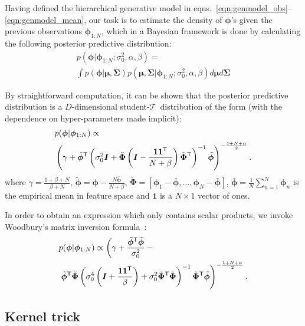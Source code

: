 \documentclass[twoside]{article}
\newcommand{\studentt}{student-$\mathcal{T}$\ }
\newcommand{\transpose}[1]{#1^{\mbox{\sf \scriptsize T}}}
\newcommand{\quadform}[2]{\transpose{#1}#2#1}
\newcommand{\varconc}{\alpha}
\newcommand{\meanconc}{\beta}
\begin{document}
Having defined the hierarchical generative model in eqns.\ \eqref{eqn:genmodel_obs}--\eqref{eqn:genmodel_mean}, our task is to estimate the density of $\bm{\phi}$'s given the previous observations $\bm{\phi}_{1:N}$, which in a Bayesian framework is done by calculating the following posterior predictive distribution:
\begin{multline*}
 p(\bm{\phi}\vert\bm{\phi}_{1:N};\sigma_0^{2},\varconc,\meanconc) = \\
 \int p(\bm{\phi}\vert \bm{\mu},\bm{\Sigma})p(\bm{\mu},\bm{\Sigma}\vert\bm{\phi}_{1:N};\sigma_0^{2},\varconc,\meanconc) d\bm{\mu}d\bm{\Sigma}
\end{multline*}

By straightforward computation, it can be shown that the posterior predictive distribution is a $D$-dimensional \studentt distribution of the form (with the dependence on hyper-parameters made implicit):
\begin{align}
  &p(\bm{\phi}\vert\bm{\phi}_{1:N}) \propto \label{eqn:postpredictive} \\
  &\left( \gamma + \quadform{\tilde{\bm{\phi}}}{\left(\sigma_0^{2}\bm{I} + \tilde{\bm{\Phi}}\left(\bm{I} - \frac{\bm{1}\transpose{\bm{1}}}{N+\meanconc}\right)\transpose{\tilde{\bm{\Phi}}}\right)^{-1}}\right)^{-\frac{1 + N + \varconc}{2}} . \notag
\end{align}
where $\gamma = \frac{1+\meanconc+N}{\meanconc+N}$,  $\tilde{\bm{\phi}} = \bm{\phi} - \frac{N\bar{\bm{\phi}}}{N+\meanconc}$, $\tilde{\bm{\Phi}} = \left[\bm{\phi}_1 - \bar{\bm{\phi}},\ldots,\bm{\phi}_N - \bar{\bm{\phi}}\right]$, $\bar{\bm{\phi}} = \frac{1}{N}\sum_{n=1}^{N}\bm{\phi}_n$ is the empirical mean in feature space and $\bm{1}$ is a $N\times1$ vector of ones.

In order to obtain an expression which only contains scalar products, we invoke Woodbury's matrix inversion formula~\cite{Hager1989}:
\begin{align}
  &p(\bm{\phi}\vert\bm{\phi}_{1:N}) \propto \left( \gamma + \frac{\quadform{\tilde{\bm{\phi}}}{}}{\sigma_0^2} \:- \right. \label{eqn:postpredictive_Woodbury} \\
  &\left. \quadform{\tilde{\bm{\phi}}}{ \tilde{\bm{\Phi}} \left(\sigma_0^{4}\left(\bm{I} + \frac{\bm{1}\transpose{\bm{1}}}{\meanconc}\right) + \sigma_0^2\quadform{\tilde{\bm{\Phi}}}{}\right)^{-1}\transpose{\tilde{\bm{\Phi}}}} \right)^{-\frac{1 + N + \varconc}{2}}. \notag
\end{align}

\subsection{Kernel trick}
\end{document}
